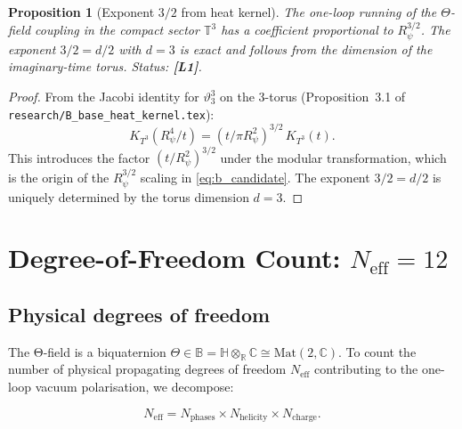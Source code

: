 \documentclass[11pt,a4paper]{article}
\newtheorem{proposition}{Proposition}
\newcommand{\Lone}{\textbf{[L1]}}
\begin{document}
\begin{proposition}[Exponent $3/2$ from heat kernel]\label{prop:exponent}
  The one-loop running of the $\Theta$-field coupling in the compact sector
  $\mathbb{T}^3$ has a coefficient proportional to $R_\psi^{3/2}$.
  The exponent $3/2 = d/2$ with $d=3$ is exact and follows from the
  dimension of the imaginary-time torus.
  Status: \Lone{}.
\end{proposition}

\begin{proof}
  From the Jacobi identity for $\vartheta_3^3$ on the 3-torus
  (Proposition~3.1 of \texttt{research/B\_base\_heat\_kernel.tex}):
  \begin{equation}
    K_{T^3}(R_\psi^4/t) = (t/\pi R_\psi^2)^{3/2}\,K_{T^3}(t).
  \end{equation}
  This introduces the factor $(t/R_\psi^2)^{3/2}$ under the modular
  transformation, which is the origin of the $R_\psi^{3/2}$ scaling in
  \eqref{eq:b_candidate}.  The exponent $3/2 = d/2$ is uniquely determined
  by the torus dimension $d=3$.
\end{proof}

\section{Degree-of-Freedom Count: $N_{\mathrm{eff}} = 12$}
\label{sec:dof}

\subsection{Physical degrees of freedom}

The Θ-field is a biquaternion $\Theta\in\mathbb{B}=\mathbb{H}\otimes_{\mathbb{R}}\mathbb{C}
\cong\mathrm{Mat}(2,\mathbb{C})$.  To count the number of physical propagating
degrees of freedom $N_{\mathrm{eff}}$ contributing to the one-loop
vacuum polarisation, we decompose:

\begin{equation}
\label{eq:neff_formula}
  N_{\mathrm{eff}}
  = N_{\mathrm{phases}}
  \times N_{\mathrm{helicity}}
  \times N_{\mathrm{charge}}.
\end{equation}
\end{document}
